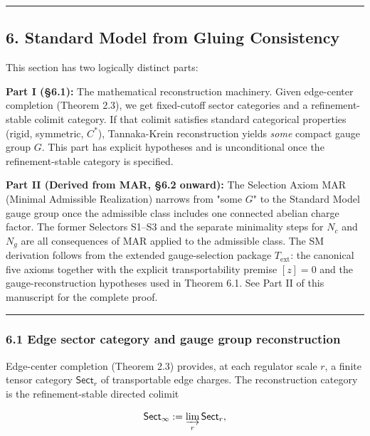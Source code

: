 \begin{center}\rule{0.5\linewidth}{0.5pt}\end{center}

\subsection{6. Standard Model from Gluing Consistency}\label{6-standard-model-from-gluing-consistency}

This section has two logically distinct parts:

\textbf{Part I (§6.1):} The mathematical reconstruction machinery. Given edge-center completion (Theorem 2.3), we get fixed-cutoff sector categories and a refinement-stable colimit category. If that colimit satisfies standard categorical properties (rigid, symmetric, \(C^*\)), Tannaka-Krein reconstruction yields \emph{some} compact gauge group \(G\). This part has explicit hypotheses and is unconditional once the refinement-stable category is specified.

\textbf{Part II (Derived from MAR, §6.2 onward):} The Selection Axiom MAR (Minimal Admissible Realization) narrows from "some \(G\)" to the Standard Model gauge group once the admissible class includes one connected abelian charge factor. The former Selectors S1--S3 and the separate minimality steps for \(N_c\) and \(N_g\) are all consequences of MAR applied to the admissible class. The SM derivation follows from the extended gauge-selection package \(T_{\mathrm{ext}}\): the canonical five axioms together with the explicit transportability premise \([z]=0\) and the gauge-reconstruction hypotheses used in Theorem 6.1. See Part II of this manuscript for the complete proof.

\begin{center}\rule{0.5\linewidth}{0.5pt}\end{center}

\subsubsection{6.1 Edge sector category and gauge group reconstruction}\label{61-edge-sector-category-and-gauge-group-reconstruction}

Edge-center completion (Theorem 2.3) provides, at each regulator scale \(r\), a finite tensor category \(\mathsf{Sect}_r\) of transportable edge charges. The reconstruction category is the refinement-stable directed colimit

\[
\mathsf{Sect}_\infty := \varinjlim_r \mathsf{Sect}_r,
\]

